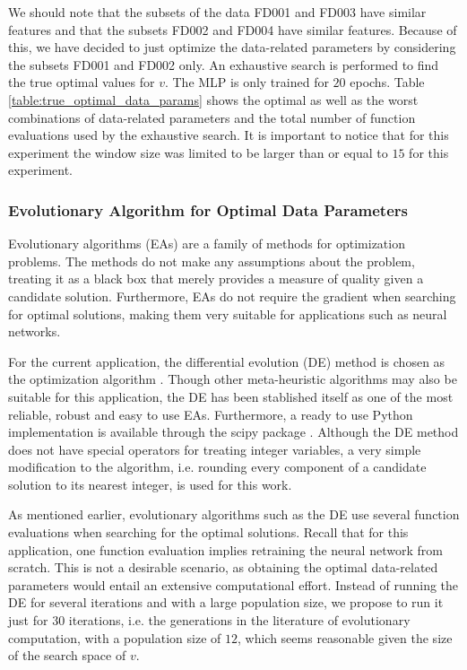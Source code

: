 \documentclass[12pt]{IEEEtran}%
\begin{document}
We should note that the subsets of the data FD001 and FD003 have similar
features and that the subsets FD002 and FD004 have similar features. Because
of this, we have decided to just optimize the data-related parameters by
considering the subsets FD001 and FD002 only. An exhaustive search is
performed to find the true optimal values for $v$. 
The MLP is only trained for $20$ epochs. Table
\ref{table:true_optimal_data_params} shows the optimal as well as the worst
combinations of data-related parameters and the total number of function
evaluations used by the exhaustive search. It is important to notice that for 
this experiment the window size was limited to be larger than or equal to $15$ 
for this experiment.

\subsubsection{Evolutionary Algorithm for Optimal Data Parameters}

\label{sec:ea_optimization_process}

Evolutionary algorithms (EAs) are a family of methods for optimization
problems. The methods do not make any assumptions about the problem, treating
it as a black box that merely provides a measure of quality given a candidate
solution. Furthermore, EAs do not require the gradient when searching for
optimal solutions, making them very suitable for applications such as neural networks.

For the current application, the differential evolution (DE) method is chosen
as the optimization algorithm \cite{Storn1997}. Though other meta-heuristic
algorithms may also be suitable for this application, the DE has been
stablished itself as one of the most reliable, robust and easy to use EAs.
Furthermore, a ready to use Python implementation is available through the
scipy package \cite{scipy}. Although the DE method does not have special
operators for treating integer variables, a very simple modification to the
algorithm, i.e. rounding every component of a candidate solution to its
nearest integer, is used for this work.

As mentioned earlier, evolutionary algorithms such as the DE use several
function evaluations when searching for the optimal solutions. Recall that for
this application, one function evaluation implies retraining the neural
network from scratch. This is not a desirable scenario, as obtaining the
optimal data-related parameters would entail an extensive computational
effort. Instead of running the DE for several iterations and with a large
population size, we propose to run it just for $30$ iterations, i.e. the
generations in the literature of evolutionary computation, with a population
size of $12$, which seems reasonable given the size of the search space of $v$.
\end{document}
